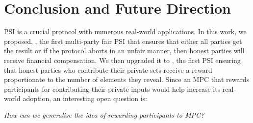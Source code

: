 
\vspace{-2mm}
\section{Conclusion and Future Direction}\label{sec::concl}


PSI is a crucial protocol with numerous real-world applications. In this work, we proposed, \withFai, the first multi-party fair PSI that ensures that either all parties get the result or if the protocol aborts in an unfair manner, then honest parties will receive financial compensation. We then upgraded it to \withRew, the first PSI ensuring that honest parties who contribute their private sets receive a reward proportionate to the number of elements they reveal. Since an MPC that rewards participants for contributing their private inputs would help increase its real-world adoption, an interesting open question is: 

\begin{center}

 \emph{How can we generalise the idea of rewarding participants to MPC?}
 \end{center}